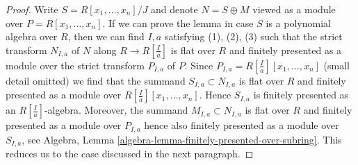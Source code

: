 \begin{proof}
Write $S = R[x_1, \ldots, x_n]/J$ and denote $N = S \oplus M$
viewed as a module over $P = R[x_1, \ldots, x_n]$. If we can prove the
lemma in case $S$ is a polynomial algebra over $R$, then we can
find $I, a$ satisfying (1), (2), (3) such that the strict transform
$N_{I, a}$ of $N$ along $R \to R[\frac{I}{a}]$ is flat over
$R$ and finitely presented as a module over the strict transform $P_{I, a}$
of $P$. Since $P_{I, a} = R[\frac{I}{a}][x_1, \ldots, x_n]$
(small detail omitted)
we find that the summand $S_{I, a} \subset N_{I, a}$ is flat over $R$
and finitely presented as a module over $R[\frac{I}{a}][x_1, \ldots, x_n]$.
Hence $S_{I, a}$ is finitely presented as an $R[\frac{I}{a}]$-algebra.
Moreover, the summand $M_{I, a} \subset N_{I, a}$ is flat over $R$
and finitely presented as a module over $P_{I, a}$ hence also
finitely presented as a module over $S_{I, a}$, see
Algebra, Lemma \ref{algebra-lemma-finitely-presented-over-subring}.
This reduces us to the case discussed in the next paragraph.


\end{proof}

